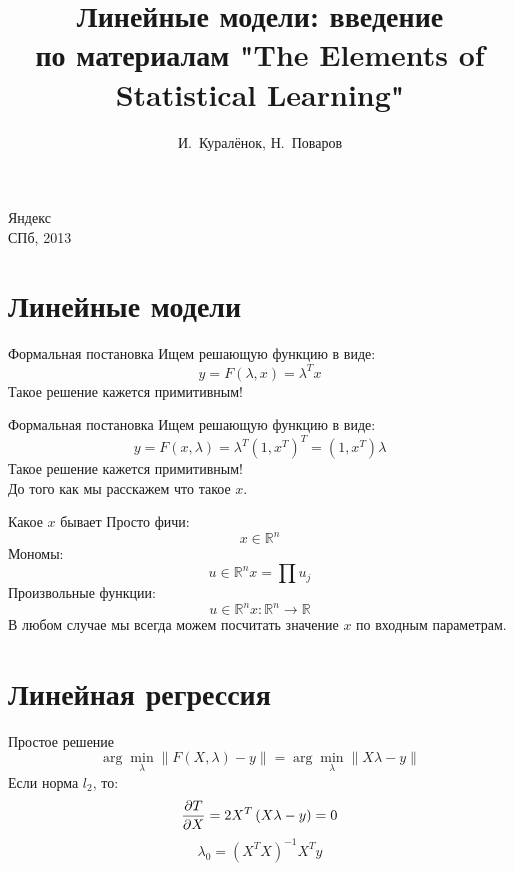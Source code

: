 \documentclass[14pt, fleqn, xcolor={dvipsnames, table}]{beamer}
\title{Линейные модели: введение\\\small{по материалам "The Elements of Statistical Learning"}}
\author[]{\small{%
И.~Куралёнок,
Н.~Поваров}}
\date{}
\begin{document}
\begin{frame}
\maketitle
\small
\begin{center}
\vspace{-60pt}
\normalsize {\color{red}Я}ндекс \\
\vspace{80pt}
\footnotesize СПб, 2013
\end{center}
\end{frame}

\section{Линейные модели}
\begin{frame}{Формальная постановка}
Ищем решающую функцию в виде:
$$
y = F(\lambda, x) = \lambda^T x
$$
Такое решение кажется примитивным!
\end{frame}
\begin{frame}{Формальная постановка}
Ищем решающую функцию в виде:
$$
y = F(x, \lambda) = \lambda^T (1, x^T)^T = (1, x^T) \lambda
$$
Такое решение кажется примитивным! \\
До того как мы расскажем что такое $x$.
\end{frame}
\begin{frame}{Какое $x$ бывает}
Просто фичи:
$$
x \in \mathbb{R}^n
$$
Мономы:
$$
u \in \mathbb{R}^n
x = \prod u_j
$$
Произвольные функции:
$$
u \in \mathbb{R}^n
x: \mathbb{R}^n \to \mathbb{R}
$$
В любом случае мы всегда можем посчитать значение $x$ по входным параметрам.
\end{frame}

\section{Линейная регрессия}
\begin{frame}{Простое решение}
$$
\arg \min_{\lambda} \|F(X, \lambda) - y\| = \arg \min_{\lambda} \|X \lambda - y\|
$$
Если норма $l_2$, то:
$$
{\partial T \over \partial X} = 2 X^T\left(X\lambda - y\right) = 0
$$
$$
\lambda_0 = (X^TX)^{-1}X^Ty
$$
\end{frame}
\end{document}
